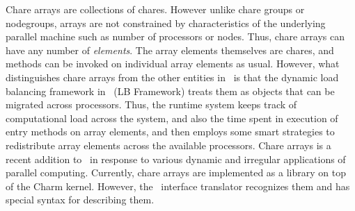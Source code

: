 Chare arrays are collections of chares. However unlike chare groups or
nodegroups, arrays are not constrained by characteristics of the underlying
parallel machine such as number of processors or nodes. Thus, chare arrays can
have any number of {\em elements}. The array elements themselves are chares,
and methods can be invoked on individual array elements as usual. However, what
distinguishes chare arrays from the other entities in \charmpp\ is that the
dynamic load balancing framework in \charmpp\ (LB Framework) treats them as
objects that can be migrated across processors. Thus, the runtime system keeps
track of computational load across the system, and also the time spent in
execution of entry methods on array elements, and then employs some smart
strategies to redistribute array elements across the available processors.
Chare arrays is a recent addition to \charmpp\ in response to various dynamic
and irregular applications of parallel computing. Currently, chare arrays are
implemented as a library on top of the Charm kernel. However, the \charmpp\
interface translator recognizes them and has special syntax for describing
them.

